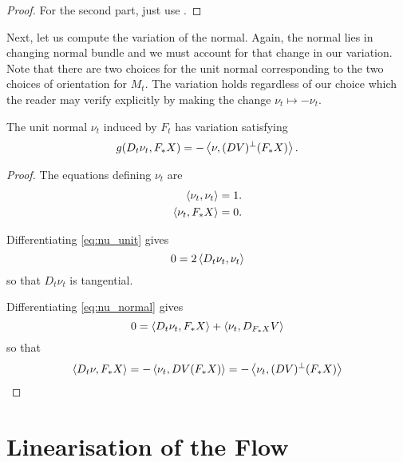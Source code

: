 \begin{proof}
For the second part, just use .
\end{proof}

Next, let us compute the variation of the normal. Again, the normal lies in changing normal bundle and we must account for that change in our variation. Note that there are two choices for the unit normal corresponding to the two choices of orientation for \(M_t\). The variation holds regardless of our choice which the reader may verify explicitly by making the change \(\nu_t \mapsto -\nu_t\).

\begin{lemma}
\label{lem:nu_t}
The unit normal \(\nu_t\) induced by \(F_t\) has variation satisfying
\[
g(D_t \nu_t, F_{\ast} X) = - \left\langle \nu,(DV)^{\perp} (F_{\ast} X) \right\rangle.
\]
\end{lemma}

\begin{proof}
The equations defining \(\nu_t\) are
\begin{align}
\label{eq:nu_unit}
\left\langle \nu_t,\nu_t \right\rangle &= 1. \\
\label{eq:nu_normal}
\left\langle \nu_t,F_{\ast} X \right\rangle &= 0.
\end{align}

Differentiating \eqref{eq:nu_unit} gives
\[
0 = 2 \left\langle D_t \nu_t,\nu_t \right\rangle
\]
so that \(D_t \nu_t\) is tangential.

Differentiating \eqref{eq:nu_normal} gives
\[
0 = \left\langle D_t \nu_t,F_{\ast} X \right\rangle + \left\langle \nu_t,D_{F_{\ast} X} V \right\rangle
\]
so that
\[
\left\langle D_t \nu,F_{\ast} X \right\rangle = - \left\langle \nu_t,DV(F_{\ast} X) \right\rangle = - \left\langle \nu_t,(DV)^{\perp}(F_{\ast} X) \right\rangle
\]
\end{proof}
\section{Linearisation of the Flow}